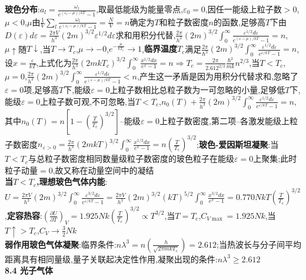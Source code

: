 \documentclass[10pt,a4paper]{article}
\begin{document}
\begin{multicols}{2}
\textbf{玻色分布}:$a_l=\frac{\omega_l}{e^{(\varepsilon_l-\mu)/kT}-1}$,取最低能级为能量零点,$\varepsilon_0=0$,因任一能级上粒子数$>0$,$\mu<0$,$\mu$由$\frac{1}{V}\sum_l\frac{\omega_l}{e^{(\varepsilon_l-\mu)/kT}-1}=\frac{N}{V}=n$确定为$T$和粒子数密度$n$的函数,足够高$T$下由$D(\varepsilon)d\varepsilon=\frac{2\pi V}{h^3}(2m)^{3/2}\varepsilon^{1/2}d\varepsilon$求和用积分代替,$\frac{2\pi}{h^3}(2m)^{3/2}\int_0^{\infty}\frac{\varepsilon^{1/2}d\varepsilon}{e^{(\varepsilon-\mu)/kT}-1}=n$,$\mu\uparrow$随$T\downarrow$,当$T\rightarrow T_c$,$\mu\rightarrow-0$,$e^{-\frac{\mu}{kT_c}}\rightarrow1$,\textbf{临界温度$T_c$}满足$\frac{2\pi}{\hbar^3}(2m)^{3/2}\int_0^{\infty}\frac{\varepsilon^{1/2}d\varepsilon}{e^{\varepsilon/kT}-1}=n$,设$x=\frac{\varepsilon}{kT}$,上式化为$\frac{2\pi}{h^3}(2mkT_c)^{3/2}\int_0^{\infty}\frac{x^{1/2}dx}{e^x-1}=n\Rightarrow T_c=\frac{2\pi}{2.612^{2/3}}\frac{\hbar^2}{mk}n^{2/3}$,当$T<T_c$,$\mu=0$,$\frac{2\pi}{h^3}(2m)^{3/2}\int_0^{\infty}\frac{\varepsilon^{1/2}d\varepsilon}{e^{(\varepsilon-\mu)/kT}-1}<n$,产生这一矛盾是因为用积分代替求和,忽略了$\varepsilon=0$项,足够高$T$下,能级$\varepsilon=0$上粒子数相比总粒子数为一可忽略的小量,足够低$T$下,能级$\varepsilon=0$上粒子数可观,不可忽略,当$T<T_c$,$n_0(T)+\frac{2\pi}{h^3}(2m)^{3/2}\int_0^{\infty}\frac{\varepsilon^{1/2}d\varepsilon}{e^{\varepsilon/kT}-1}=n$,其中$n_0(T)=n\left[1-\left(\frac{T}{T_c}\right)^{3/2}\right]$--能级$\varepsilon=0$上粒子数密度,第二项--各激发能级上粒子数密度$n_{\varepsilon>0}=\frac{2\pi}{h^3}(2mkT)^{3/2}\int_0^{\infty}\frac{x^{1/2}dx}{e^x-1}=n\left(\frac{T}{T_c}\right)^{3/2}$;\textbf{玻色-爱因斯坦凝聚}:当$T<T_c$与总粒子数密度相同数量级粒子数密度的玻色粒子在能级$\varepsilon=0$上聚集;此时粒子动量$=0$,故又称在动量空间中的凝结\\
\textbf{当$T<T_c$,理想玻色气体内能}:$U=\frac{2\pi V}{h^3}(2m)^{3/2}\int_0^{\infty}\frac{\varepsilon^{3/2}d\varepsilon}{e^{\varepsilon/kT}-1}=\frac{2\pi V}{h^3}(2m)^{3/2}(kT)^{5/2}\int_0^{\infty}\frac{x^{3/2}dx}{e^x-1}=0.770NkT\left(\frac{T}{T_c}\right)^{3/2}$,\textbf{定容热容}:$\left(\frac{\partial U}{\partial T}\right)_V=1.925Nk\left(\frac{T}{T_c}\right)^{3/2}\propto T^{3/2}$,当$T=T_c$,$C_{V\max}=1.925Nk$,当$T\uparrow>T_c$,$C_V\rightarrow\frac{3}{2}Nk$\\
\textbf{弱作用玻色气体凝聚}:临界条件:$n\lambda^3=n\left(\frac{h}{\sqrt{2\pi mkT_c}}\right)=2.612$;当热波长与分子间平均距离具有相同量级,量子关联起决定性作用,凝聚出现的条件:$n\lambda^3\geq2.612$\\
\textbf{8.4 光子气体}

\end{multicols}
\end{document}
